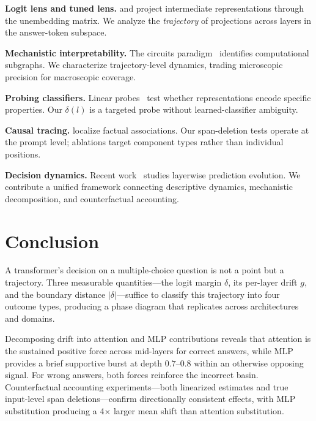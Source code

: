 \documentclass{article}
\begin{document}
\textbf{Logit lens and tuned lens.}  \citet{nostalgebraist2020} and \citet{belrose2023} project intermediate representations through the unembedding matrix.  We analyze the \emph{trajectory} of projections across layers in the answer-token subspace.

\textbf{Mechanistic interpretability.}  The circuits paradigm~\cite{elhage2021,olsson2022,conmy2023} identifies computational subgraphs.  We characterize trajectory-level dynamics, trading microscopic precision for macroscopic coverage.

\textbf{Probing classifiers.}  Linear probes~\cite{belinkov2022,hewitt2019} test whether representations encode specific properties.  Our $\delta(l)$ is a targeted probe without learned-classifier ambiguity.

\textbf{Causal tracing.}  \citet{meng2022} localize factual associations.  Our span-deletion tests operate at the prompt level; ablations target component types rather than individual positions.

\textbf{Decision dynamics.}  Recent work~\cite{din2023,geva2023} studies layerwise prediction evolution.  We contribute a unified framework connecting descriptive dynamics, mechanistic decomposition, and counterfactual accounting.


\section{Conclusion}

A transformer's decision on a multiple-choice question is not a point but a trajectory.  Three measurable quantities---the logit margin $\delta$, its per-layer drift $g$, and the boundary distance $|\delta|$---suffice to classify this trajectory into four outcome types, producing a phase diagram that replicates across architectures and domains.

Decomposing drift into attention and MLP contributions reveals that attention is the sustained positive force across mid-layers for correct answers, while MLP provides a brief supportive burst at depth $0.7$--$0.8$ within an otherwise opposing signal.  For wrong answers, both forces reinforce the incorrect basin.  Counterfactual accounting experiments---both linearized estimates and true input-level span deletions---confirm directionally consistent effects, with MLP substitution producing a 4$\times$ larger mean shift than attention substitution.
\end{document}
